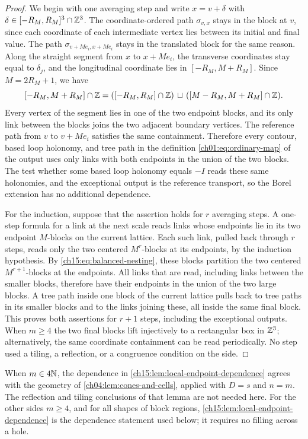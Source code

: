 \begin{proof}
We begin with one averaging step and write $x=v+\delta$ with $\delta\in[-R_M,R_M]^3\cap\mathbb Z^3$. The coordinate-ordered path $\sigma_{v,x}$ stays in the block at $v$, since each coordinate of each intermediate vertex lies between its initial and final value. The path $\sigma_{v+Me_i,x+Me_i}$ stays in the translated block for the same reason. Along the straight segment from $x$ to $x+Me_i$, the transverse coordinates stay equal to $\delta_j$, and the longitudinal coordinate lies in $[-R_M,M+R_M]$. Since $M=2R_M+1$, we have
\[
 [-R_M,M+R_M]\cap\mathbb Z
 =([-R_M,R_M]\cap\mathbb Z)\,\sqcup\,
       ([M-R_M,M+R_M]\cap\mathbb Z).
\]
Every vertex of the segment lies in one of the two endpoint blocks, and its only link between the blocks joins the two adjacent boundary vertices. The reference path from $v$ to $v+Me_i$ satisfies the same containment. Therefore every contour, based loop holonomy, and tree path in the definition \eqref{ch01:eq:ordinary-map} of the output uses only links with both endpoints in the union of the two blocks. The test whether some based loop holonomy equals $-I$ reads these same holonomies, and the exceptional output is the reference transport, so the Borel extension has no additional dependence.

For the induction, suppose that the assertion holds for $r$ averaging steps. A one-step formula for a link at the next scale reads links whose endpoints lie in its two endpoint $M$-blocks on the current lattice. Each such link, pulled back through $r$ steps, reads only the two centered $M^r$-blocks at its endpoints, by the induction hypothesis. By \eqref{ch15:eq:balanced-nesting}, these blocks partition the two centered $M^{r+1}$-blocks at the endpoints. All links that are read, including links between the smaller blocks, therefore have their endpoints in the union of the two large blocks. A tree path inside one block of the current lattice pulls back to tree paths in its smaller blocks and to the links joining these, all inside the same final block. This proves both assertions for $r+1$ steps, including the exceptional outputs. When $m\ge4$ the two final blocks lift injectively to a rectangular box in $\mathbb Z^3$; alternatively, the same coordinate containment can be read periodically. No step used a tiling, a reflection, or a congruence condition on the side.
\end{proof}

\begin{remark}\label{ch15:rem:cones-comparison}
When $m\in4\mathbb N$, the dependence in \cref{ch15:lem:local-endpoint-dependence} agrees with the geometry of \cref{ch04:lem:cones-and-cells}, applied with $D=s$ and $n=m$. The reflection and tiling conclusions of that lemma are not needed here. For the other sides $m\ge4$, and for all shapes of block regions, \cref{ch15:lem:local-endpoint-dependence} is the dependence statement used below; it requires no filling across a hole.
\end{remark}

